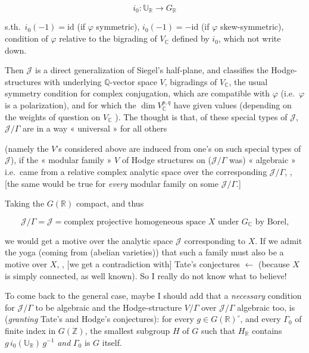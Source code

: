 \documentclass[11pt,a4paper]{article}
\begin{document}
\[ i_{0} : \mathbb{U}_{\mathbb{R}} \longrightarrow G_{\mathbb{R}} \]

s.th.\ $i_{0}(-1) = \mathrm{id}$ (if $\varphi$ symmetric), $i_{0}(-1) =
-\mathrm{id}$ (if $\varphi$ skew-symmetric), \struck{\ill{}}  condition of $\varphi$ relative to the bigrading of $V_{\mathbb{C}}$
defined by $i_{0}$, which  not write down.

Then $\mathcal{J}$ is a direct generalization of Siegel's half-plane, and
classifies the Hodge-structures \struck{\ill{}} with underlying
$\mathbb{Q}$-vector space $V$,   bigradings of $V_{\mathbb{C}}$,
\struck{\ill{}}  the usual symmetry condition for complex
conjugation, which are compatible with $\varphi$ (i.e.\ $\varphi$ is a
 polarization), and for which the $\dim V_{\mathbb{C}}^{p,q}$
have given values (depending on the weights of \ill{} question on
$V_{\mathbb{C}}$ \ill{}). The thought is that, \struck{\ill{}} of these special
types of $\mathcal{J}$, $\mathcal{J}/\Gamma$ are in a way « universal » for all
others


(namely the $V$'s considered above are induced from one's on such special types
of $\mathcal{J}$), if the « modular family » $V$  of Hodge
structures on ($\mathcal{J}/\Gamma$ was) « algebraic » i.e.\ came from a
relative complex analytic space over the corresponding \ill{} $\mathcal{J}/
\Gamma$, , [the same would be true for \emph{every} modular family on some
$\mathcal{J}/\Gamma$.]

Taking the   $G(\mathbb{R})$ compact,
 and thus

\[ \mathcal{J}/\Gamma = \mathcal{J} = \text{complex projective homogeneous space } X \text{ under } G_{\mathbb{C}} \text{ by Borel,} \]

we would get a  motive over the analytic space $\mathcal{J}$
corresponding to $X$. If we admit the yoga  (coming from
 (abelian varieties)) that such a family must also be a motive
over $X$, , [we
 get a contradiction with] Tate's conjectures $\leftarrow$
(because $X$ is simply connected, as well known). So I really do not know what
to believe!


To come back to the general case, maybe I should add that a \emph{necessary}
condition for $\mathcal{J}/\Gamma$ to be algebraic and the Hodge-structure
$V/\Gamma$ over $\mathcal{J}/\Gamma$ algebraic too, is (\emph{granting} Tate's
and Hodge's conjectures): for every $g \in G(\mathbb{R})^{\circ}$, and every
$\Gamma_{0}$ of finite index in $G(\mathbb{Z})$, the smallest 
subgroup $H$ of $G$ such that $H_{\mathbb{R}}$ contains
$g\, i_{0}(\mathbb{U}_{\mathbb{R}})\, g^{-1}$ \emph{and} $\Gamma_{0}$ is $G$
itself.
\end{document}
